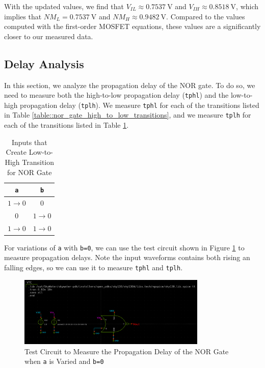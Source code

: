 \documentclass{article}
\begin{document}
	\noindent With the updated values, we find that $V_{IL} \approx 0.7537\ \text{V}$ and $V_{IH} \approx 0.8518\ \text{V}$, which implies that $NM_L = 0.7537\ \text{V}$ and $NM_H \approx 0.9482\ \text{V}$. Compared to the values computed with the first-order MOSFET equations, these values are a significantly closer to our measured data.
	
	\subsection{Delay Analysis}
	
	In this section, we analyze the propagation delay of the NOR gate. To do so, we need to measure both the high-to-low propagation delay (\texttt{tphl}) and the low-to-high propagation delay (\texttt{tplh}). We measure \texttt{tphl} for each of the transitions listed in Table \ref{table::nor_gate_high_to_low_transitions}, and we measure \texttt{tplh} for each of the transitions listed in Table \ref{table::nor_gate_low_to_high_transitions}.
	
	\begin{table}[H]
	\begin{center}
	\caption{Inputs that Create Low-to-High Transition for NOR Gate}
	\label{table::nor_gate_low_to_high_transitions}
	\begin{tabular}{| c | c |}
		\hline
		\texttt{a} & \texttt{b} \\
		\hline	
		$1 \rightarrow 0$ & $0$\\
		\hline	
		$0$ & $1 \rightarrow 0$\\
		\hline	
		$1 \rightarrow 0$ & $1 \rightarrow 0$\\
		\hline
	\end{tabular}
	\end{center}
	\end{table}
	
	\noindent For variations of \texttt{a} with \texttt{b=0}, we can use the test circuit shown in Figure \ref{fig::nor_delay_test_sweep_va} to measure propagation delays. Note the input waveforms contains both rising an falling edges, so we can use it to measure \texttt{tphl} and \texttt{tplh}.

	\begin{figure}[H]
		\centerline{\includegraphics[width=0.8\textwidth]{nor_delay_test_sweep_va.png}}
		\caption{Test Circuit to Measure the Propagation Delay of the NOR Gate when \texttt{a} is Varied and \texttt{b=0}}
		\label{fig::nor_delay_test_sweep_va}
	\end{figure}
	
\end{document}
